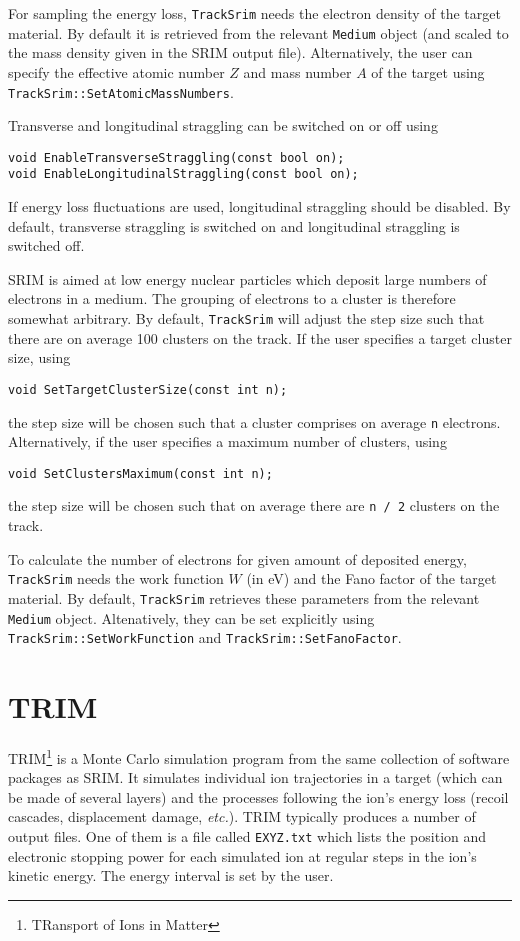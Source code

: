 For sampling the energy loss, \texttt{TrackSrim} needs the 
electron density of the target material. By default it is retrieved 
from the relevant \texttt{Medium} object (and scaled to the mass density 
given in the SRIM output file). 
Alternatively, the user can specify the effective atomic number $Z$ 
and mass number $A$ of the target 
using \texttt{TrackSrim::SetAtomicMassNumbers}.


Transverse and longitudinal straggling can be switched on or off using
\begin{lstlisting}
void EnableTransverseStraggling(const bool on);
void EnableLongitudinalStraggling(const bool on);
\end{lstlisting}
If energy loss fluctuations are used, longitudinal straggling should be disabled.
By default, transverse straggling is switched on and longitudinal straggling 
is switched off. 

SRIM is aimed at low energy nuclear particles which deposit large numbers of electrons in a medium. 
The grouping of electrons to a cluster is therefore somewhat arbitrary. 
By default, \texttt{TrackSrim} will adjust the step size such that 
there are on average 100 clusters on the track.
If the user specifies a target cluster size, using
\begin{lstlisting}
void SetTargetClusterSize(const int n);
\end{lstlisting}
the step size will be chosen such that a cluster comprises on average 
\texttt{n} electrons. Alternatively, if the user specifies a maximum 
number of clusters, using
\begin{lstlisting}
void SetClustersMaximum(const int n);
\end{lstlisting}
the step size will be chosen such that on average there are 
\texttt{n / 2} clusters on the track.

To calculate the number of electrons for given amount of deposited energy,
\texttt{TrackSrim} needs the work function $W$ (in eV) and the 
Fano factor of the target material. 
By default, \texttt{TrackSrim} retrieves these parameters from the 
relevant \texttt{Medium} object.
Altenatively, they can be set explicitly using 
\texttt{TrackSrim::SetWorkFunction} and \texttt{TrackSrim::SetFanoFactor}.

\section{TRIM}
TRIM\footnote{TRansport of Ions in Matter} is a Monte Carlo simulation program 
from the same collection of software packages as SRIM. 
It simulates individual ion trajectories in a target 
(which can be made of several layers) and the processes following the ion's energy loss 
(recoil cascades, displacement damage, \textit{etc.}). 
TRIM typically produces a number of output files. 
One of them is a file called \texttt{EXYZ.txt} which lists the 
position and electronic stopping power for each simulated ion at 
regular steps in the ion's kinetic energy.
The energy interval is set by the user.

